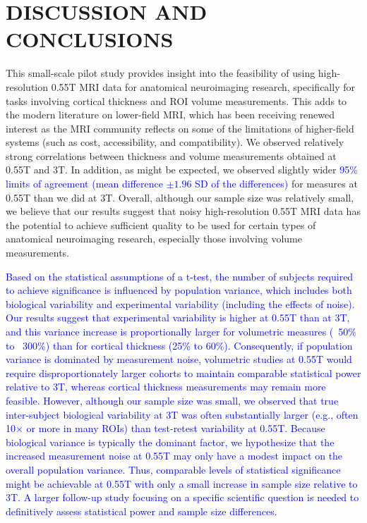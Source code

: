 \documentclass[12pt,letterpaper,onecolumn]{article}
\newcommand{\mycomment}[1]
{\todo[caption={#1},color=red!100!green!33,noline]{\color{black} \begin{spacing}{0.5}#1\vspace{-0.5em}\end{spacing}}}
\begin{document}
\section{DISCUSSION AND CONCLUSIONS}\label{sec:conclusion}
This {\color{.} small-scale pilot} study provides insight into the feasibility of using high-resolution 0.55T MRI data for anatomical neuroimaging research, specifically for tasks involving cortical thickness and ROI volume measurements. {\color{.} This  adds to the modern literature on lower-field MRI, which has been receiving renewed interest as the MRI community reflects on some of the limitations of higher-field systems (such as cost, accessibility, and compatibility).}  We observed relatively strong correlations between thickness and volume measurements obtained at 0.55T and 3T. 
In addition, as might be expected, we observed slightly wider \textcolor{blue}{95\% limits of agreement (mean difference $\pm 1.96$ SD of the differences)\mycomment{R1.3}} for measures at 0.55T than we did at 3T.  Overall, although our sample size was relatively small, we believe that our results suggest that noisy high-resolution 0.55T MRI data {has the potential} to achieve sufficient quality to be used for {certain types of} anatomical neuroimaging research, {especially those involving volume measurements.}

\textcolor{blue}{Based on the statistical assumptions of a t-test, the number of subjects required to achieve significance is influenced by population variance, which includes both biological variability and experimental variability (including the effects of noise). Our results suggest that experimental variability is higher at 0.55T than at 3T, and this variance increase is proportionally larger for volumetric measures (~50\% to ~300\%) than for cortical thickness (25\% to 60\%). Consequently, if population variance is dominated by measurement noise, volumetric studies at 0.55T would require disproportionately larger cohorts to maintain comparable statistical power relative to 3T, whereas cortical thickness measurements may remain more feasible. However, although our sample size was small, we observed that true inter-subject biological variability at 3T was often substantially larger (e.g., often 10$\times$ or more in many ROIs) than test-retest variability at 0.55T. Because biological variance is typically the dominant factor, we hypothesize that the increased measurement noise at 0.55T may only have a modest impact on the overall population variance. Thus, comparable levels of statistical significance might be achievable at 0.55T with only a small increase in sample size relative to 3T. A larger follow-up study focusing on a specific scientific question is needed to definitively assess statistical power and sample size differences.\mycomment{R1.2}}
\end{document}
